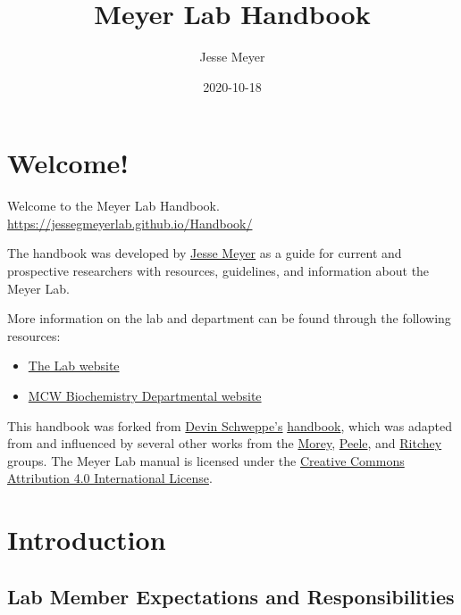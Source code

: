 \documentclass[
]{book}
\title{Meyer Lab Handbook}
\author{Jesse Meyer}
\date{2020-10-18}
\providecommand{\tightlist}{%
  \setlength{\itemsep}{0pt}\setlength{\parskip}{0pt}}
\begin{document}
\maketitle

{
\setcounter{tocdepth}{1}
\tableofcontents
}
\hypertarget{welcome}{%
\chapter{Welcome!}\label{welcome}}

Welcome to the Meyer Lab Handbook.
\url{https://jessegmeyerlab.github.io/Handbook/}

The handbook was developed by \href{https://www.jessemeyerlab.com/our-team}{Jesse Meyer} as a guide for current and prospective researchers with resources, guidelines, and information about the Meyer Lab.

More information on the lab and department can be found through the following resources:

\begin{itemize}
\tightlist
\item
  \href{https://www.jessemeyerlab.com}{The Lab website}
\item
  \href{https://www.mcw.edu/departments/biochemistry}{MCW Biochemistry Departmental website}
\end{itemize}

This handbook was forked from \href{https://www.schweppelab.org/}{Devin Schweppe's} \href{https://schweppelab.github.io/Handbook/index.html}{handbook}, which was adapted from and influenced by several other works from the \href{https://ccmorey.github.io/labHandbook/index.html}{Morey}, \href{https://github.com/jpeelle/peellelab_manual/blob/master/peellelab_manual.pdf}{Peele}, and \href{http://www.thememolab.org/resources/}{Ritchey} groups. The Meyer Lab manual is licensed under the \href{https://creativecommons.org/licenses/by/4.0/}{Creative Commons Attribution 4.0 International License}.

\hypertarget{intro}{%
\chapter{Introduction}\label{intro}}

\hypertarget{lab-member-expectations-and-responsibilities}{%
\section{Lab Member Expectations and Responsibilities}\label{lab-member-expectations-and-responsibilities}}
\end{document}
